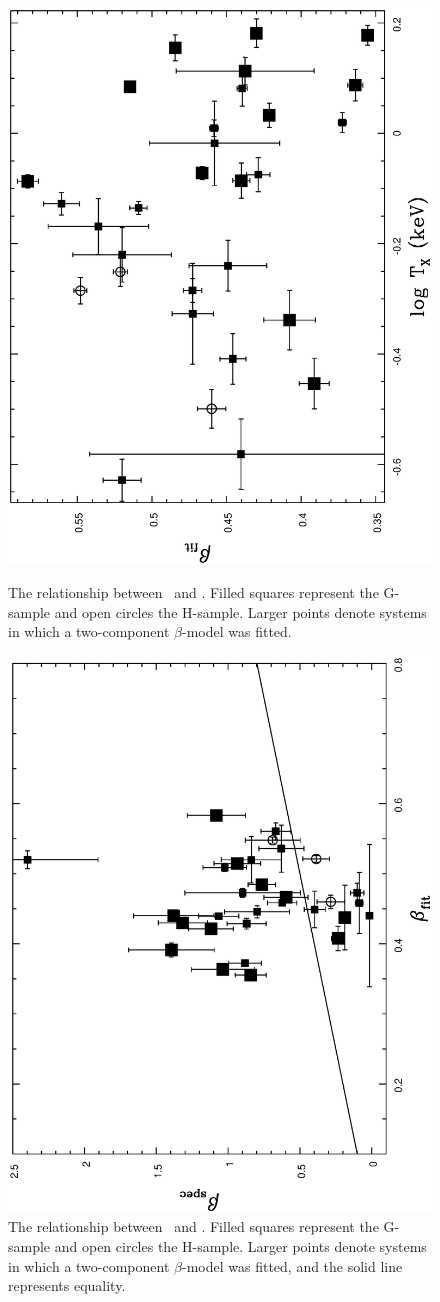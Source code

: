 \documentclass[usenatbib]{mn2e}
\begin{document}
\begin{figure}

  \includegraphics[height=\linewidth,angle=270]{fig_20.ps}
  \caption{The relationship between \betafit\ and \TX.  Filled squares
           represent the G-sample and open circles the H-sample.  Larger points
           denote systems in which a two-component $\beta$-model was fitted.}
   \label{fig_betafit_TX}

  \includegraphics[height=\linewidth,angle=270]{fig_21.ps}
  \caption{The relationship between \betaspec\ and \betafit.  Filled squares
           represent the G-sample and open circles the H-sample.  Larger points
           denote systems in which a two-component $\beta$-model was fitted, and
           the solid line represents equality.}
  \label{fig_betaspec_betafit}

\end{figure}
\end{document}
